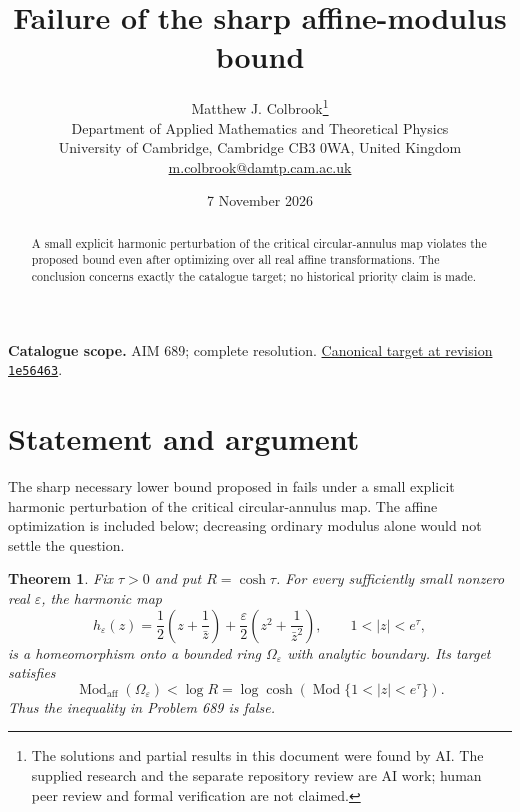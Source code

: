 \documentclass[11pt,a4paper]{article}
\newtheorem{theorem}{Theorem}[section]
\theoremstyle{remark}
\begin{document}
\title{Failure of the sharp affine-modulus bound}
\author{Matthew J. Colbrook\thanks{The solutions and partial results in this document were found by AI. The supplied research and the separate repository review are AI work; human peer review and formal verification are not claimed.}\\[4pt]
\small Department of Applied Mathematics and Theoretical Physics\\
\small University of Cambridge, Cambridge CB3 0WA, United Kingdom\\
\small\href{mailto:m.colbrook@damtp.cam.ac.uk}{m.colbrook@damtp.cam.ac.uk}}
\date{7 November 2026}
\maketitle
\begin{abstract}
A small explicit harmonic perturbation of the critical circular-annulus map violates the proposed bound even after optimizing over all real affine transformations. The conclusion concerns exactly the catalogue target; no historical priority claim is made.
\end{abstract}
\noindent\textbf{Catalogue scope.} AIM 689; complete resolution. \href{https://github.com/MColbrook/AIM/blob/1e564633494c109edfd3ec46da1366adcff925a5/problems/689-a-sharp-affine-modulus-bound-for-harmonic-homeomorphisms.md}{Canonical target at revision \texttt{1e56463}}.


\section{Statement and argument}
\label{sec:689}

The sharp necessary lower bound proposed in \cite[Conjecture 1.3]{IwaniecKovalevOnninen} fails under a small explicit harmonic perturbation of the critical circular-annulus map. The affine optimization is included below; decreasing ordinary modulus alone would not settle the question.

\begin{theorem}
Fix $\tau>0$ and put $R=\cosh\tau$. For every sufficiently small nonzero real $\varepsilon$, the harmonic map
\begin{equation}
 h_\varepsilon(z)=\frac12\left(z+\frac1{\bar z}\right)
       +\frac\varepsilon2\left(z^2+\frac1{\bar z^2}\right),
 \qquad 1<|z|<e^\tau,
 \label{eq:689-map}
\end{equation}
is a homeomorphism onto a bounded ring $\Omega_\varepsilon$ with analytic boundary. Its target satisfies
\[
 \operatorname{Mod}_{\mathrm{aff}}(\Omega_\varepsilon)
 <\log R=\log\cosh\!\left(\operatorname{Mod}\{1<|z|<e^\tau\}\right).
\]
Thus the inequality in Problem 689 is false.
\end{theorem}
\end{document}
